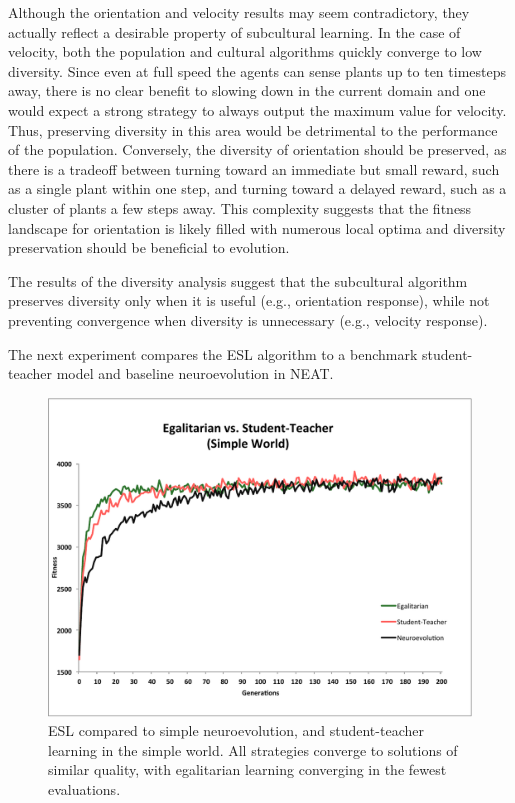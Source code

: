 \documentclass{sig-alternate}
\begin{document}
Although the orientation and velocity results may seem contradictory, they actually reflect a desirable property of subcultural learning. In the case of velocity, both the population and cultural algorithms quickly converge to low diversity. Since even at full speed the agents can sense plants up to ten timesteps away, there is no clear benefit to slowing down in the current domain and one would expect a strong strategy to always output the maximum value for velocity. Thus, preserving diversity in this area would be detrimental to the performance of the population. Conversely, the diversity of orientation should be preserved, as there is a tradeoff between turning toward an immediate but small reward, such as a single plant within one step, and turning toward a delayed reward, such as a cluster of plants a few steps away. This complexity suggests that the fitness landscape for orientation  is likely filled with numerous local optima and diversity preservation should be beneficial to evolution. 

The results of the diversity analysis suggest that the subcultural algorithm preserves diversity only when it is useful (e.g., orientation response), while not preventing convergence when diversity is unnecessary (e.g., velocity response).

The next experiment compares the ESL algorithm to a benchmark student-teacher model and baseline neuroevolution in NEAT.

\begin{figure}[t]
  \centering
    \includegraphics[scale=.41]{egalitarian_vs_student_teacher_simple.pdf}
  \caption{ESL compared to simple neuroevolution, and student-teacher learning in the simple world. All strategies converge to solutions of similar quality, with egalitarian learning converging in the fewest evaluations.}
  \label{fig:reward-studentteacher-simple}
\end{figure}
\end{document}
